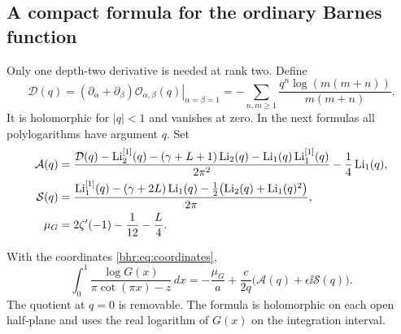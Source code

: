 \subsection{A compact formula for the ordinary Barnes function}

Only one depth-two derivative is needed at rank two. Define
\begin{equation}\label{bhr:eq:Dq}
 \mathcal D(q)=
    \left.(\partial_\alpha+\partial_\beta)
                      \mathcal O_{\alpha,\beta}(q)\right|_{\alpha=\beta=1}
  =-\sum_{n,m\ge1}\frac{q^n\log(m(m+n))}{m(m+n)}.
\end{equation}
It is holomorphic for $|q|<1$ and vanishes at zero. In the next
formulas all polylogarithms have argument $q$. Set
\begin{align}
 \mathcal A(q)
  &=\frac{\mathcal D(q)-\operatorname{Li}_2^{[1]}(q)
       -(\gamma+L+1)\operatorname{Li}_2(q)-\operatorname{Li}_1(q)\operatorname{Li}_1^{[1]}(q)}{2\pi^2}
           -\frac14\operatorname{Li}_1(q),\label{bhr:eq:Aq}\\
 \mathcal S(q)
  &=\frac{\operatorname{Li}_1^{[1]}(q)-(\gamma+2L)\operatorname{Li}_1(q)
            -\tfrac12\bigl(\operatorname{Li}_2(q)+\operatorname{Li}_1(q)^2\bigr)}{2\pi},
        \label{bhr:eq:Sq}\\
 \mu_G&=2\zeta'(-1)-\frac1{12}-\frac L4.
       \label{bhr:eq:meanG}
\end{align}

\begin{theorem}\label{bhr:thm:G-resolvent}
With the coordinates \eqref{bhr:eq:coordinates},
\begin{equation}\label{bhr:eq:G-resolvent}
 \boxed{\displaystyle
 \int_0^1\frac{\log G(x)}{\pi\cot(\pi x)-z}\,dx
    =-\frac{\mu_G}{a}
       +\frac c{2q}\bigl(\mathcal A(q)+\epsilon\ii\mathcal S(q)\bigr).}
\end{equation}
The quotient at $q=0$ is removable. The formula is holomorphic
on each open half-plane and uses the real logarithm of $G(x)$
on the integration interval.
\end{theorem}


